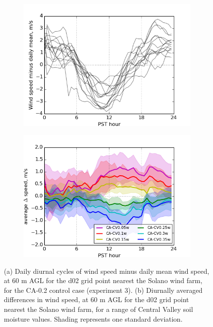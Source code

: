 \begin{figure}[here]
\begin{subfigure}{0.5\textwidth}
\includegraphics[width=1\textwidth]{ch3-wind/img/solano_controlwind_minusmean_CA0pt2_d02_level0.png}
\caption{}
\end{subfigure}
\begin{subfigure}{0.5\textwidth}
\includegraphics[width=1\textwidth]{ch3-wind/img/solano_diurnalwind_CV_0pt2_d02_level0.png}
\caption{}
\end{subfigure}
\caption{(a) Daily diurnal cycles of wind speed minus daily mean wind speed, at 60 m AGL for the d02 grid point nearest the Solano wind farm, for the CA-0.2 control case (experiment 3).  (b) Diurnally averaged differences in wind speed, at 60 m AGL for the d02 grid point nearest the Solano wind farm, for a range of Central Valley soil moisture values.  Shading represents one standard deviation.}
\label{fig:windSol_DiffDiurnalCV0pt2}
\end{figure}

